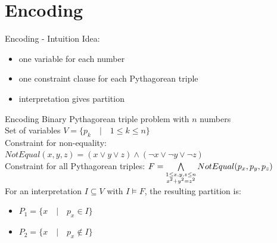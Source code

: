 \documentclass[c,8pt,xcolor...,x11names,usenames,dvipsnames]{beamer}
\begin{document}
\section{Encoding}

\begin{frame}{Encoding - Intuition}
	Idea:
	\begin{itemize}
		\item one variable for each number
		\pause
		\item one constraint clause for each Pythagorean triple
		\pause
		\item interpretation gives partition
	\end{itemize}
\end{frame}

\begin{frame}{Encoding}
	Binary Pythagorean triple problem with $n$ numbers \\
	\vspace{5px}
	\pause
	Set of variables $V = \{ p_k \quad | \quad 1 \leq k \leq n \}$ \\
	\vspace{5px}
	\pause
	Constraint for non-equality: $NotEqual(x,y,z) = (x \vee y \vee z) \wedge (\neg x \vee \neg y \vee \neg z) $ \\
	\vspace{5px}
	\pause
	Constraint for all Pythagorean triples: $F = \bigwedge\limits_{\small\substack{1 \leq x,y,z \leq n \\ x^2+y^2=z^2}} NotEqual(p_x,p_y,p_z)$ \\
	\vspace{10px}
	\pause
	For an interpretation $I \subseteq V$ with $I \models F$, the resulting partition is:
	\begin{itemize}
		\item $ P_1 = \{ x \quad | \quad p_x \in I \}$
		\item $ P_2 = \{ x \quad | \quad p_x \notin I \} $
	\end{itemize}
\end{frame}
\end{document}
